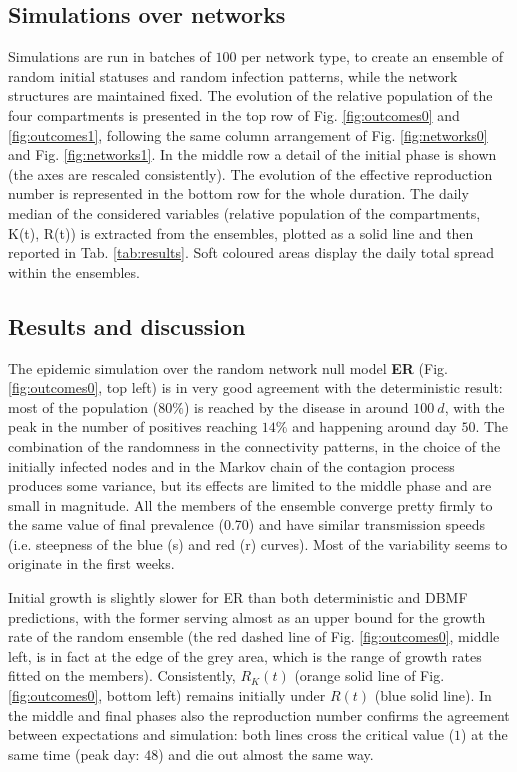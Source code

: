 \documentclass[DIV=12, BCOR=0pt]{scrartcl}  %
\begin{document}
  \subsection{Simulations over networks}
  Simulations are run in batches of $100$ per network type, to create an ensemble of random initial statuses and random infection patterns, while the network structures are maintained fixed. The evolution of the relative population of the four compartments is presented in the top row of Fig. \ref{fig:outcomes0} and \ref{fig:outcomes1}, following the same column arrangement of Fig. \ref{fig:networks0} and Fig. \ref{fig:networks1}. In the middle row a detail of the initial phase is shown (the axes are rescaled consistently). The evolution of the effective reproduction number is represented in the bottom row for the whole duration. The daily median of the considered variables (relative population of the compartments, K(t), R(t)) is extracted from the ensembles, plotted as a solid line and then reported in Tab. \ref{tab:results}. Soft coloured areas display the daily total spread within the ensembles.
  
  
  \subsection{Results and discussion}
  The epidemic simulation over the random network null model \textbf{ER} (Fig. \ref{fig:outcomes0}, top left) is in very good agreement with the deterministic result: most of the population ($80 \%$) is reached by the disease in around $100 \ d$, with the peak in the number of positives reaching $14 \%$ and happening around day $50$. The combination of the randomness in the connectivity patterns, in the choice of the initially infected nodes and in the Markov chain of the contagion process produces some variance, but its effects are limited to the middle phase and are small in magnitude. All the members of the ensemble converge pretty firmly to the same value of final prevalence (0.70) and have similar transmission speeds (i.e. steepness of the blue (s) and red (r) curves). Most of the variability seems to originate in the first weeks.
  
  Initial growth is slightly slower for ER than both deterministic and DBMF predictions, with the former serving almost as an upper bound for the growth rate of the random ensemble (the red dashed line of Fig. \ref{fig:outcomes0}, middle left, is in fact at the edge of the grey area, which is the range of growth rates fitted on the members). Consistently, $R_K(t)$ (orange solid line of Fig. \ref{fig:outcomes0}, bottom left) remains initially under $R(t)$ (blue solid line). In the middle and final phases also the reproduction number confirms the agreement between expectations and simulation: both lines cross the critical value ($1$) at the same time (peak day: $48$) and die out almost the same way.
  
\end{document}
